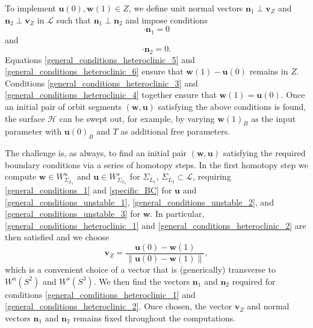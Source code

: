 \documentclass{ws-ijbc}
\begin{document}
To implement $\mathbf{u}(0), \mathbf{w}(1) \in Z$, we define unit normal vectors $\mathbf{n}_1 \perp \mathbf{v}_Z$ and $\mathbf{n}_2 \perp \mathbf{v}_Z$ in $\mathscr{L}$ such that $\mathbf{n}_1 \perp \mathbf{n}_2$ and impose conditions
%
\begin{equation}
	[\mathbf{u}(0) - \mathbf{w}(1)] \cdot \mathbf{n}_1 =0
	\label{general_conditions_heteroclinic_5}
\end{equation}
%
and
%
\begin{equation}	
	 [\mathbf{u}(0) - \mathbf{w}(1)] \cdot \mathbf{n}_2 =0.
	 \label{general_conditions_heteroclinic_6}
\end{equation}
%
Equations \eqref{general_conditions_heteroclinic_5} and \eqref{general_conditions_heteroclinic_6} ensure that $\mathbf{w}(1)-\mathbf{u}(0)$ remains in $Z$.  Conditions \eqref{general_conditions_heteroclinic_3} and \eqref{general_conditions_heteroclinic_4} together ensure that $\mathbf{w}(1) = \mathbf{u}(0)$.  Once an initial pair of orbit segments $(\mathbf{w}, \mathbf{u})$ satisfying the above conditions is found, the surface $\mathscr{H}$ can be swept out, for example, by varying $\mathbf{w}(1)_B$ as the input parameter with $\mathbf{u}(0)_B$ and $T$ as additional free parameters.  

The challenge is, as always, to find an initial pair $(\mathbf{w}, \mathbf{u})$ satisfying the required boundary conditions via a series of homotopy steps.  In the first homotopy step we compute $\mathbf{w} \in W^u_{\Sigma_{L_1}}$ and $\mathbf{u} \in W^s_{\Sigma_{L_2}}$ for $\Sigma_{L_1} $, $\Sigma_{L_2} \subset \mathscr{L}$, requiring \eqref{general_conditions_1} and \eqref{specific_BC} for $\mathbf{u}$ and \eqref{general_conditions_unstable_1}, \eqref{general_conditions_unstable_2}, and \eqref{general_conditions_unstable_3} for $\mathbf{w}$.  In particular, \eqref{general_conditions_heteroclinic_1} and \eqref{general_conditions_heteroclinic_2} are then satisfied and we choose
%
\begin{equation*}
		\mathbf{v}_Z = \frac{\mathbf{u}(0) - \mathbf{w}(1)}{\left\lVert \mathbf{u}(0) - \mathbf{w}(1) \right\lVert},
		\label{Lin_vector}
\end{equation*}
%
which is a convenient choice of a vector that is (generically) transverse to $W^u(S^2)$ and $W^s(S^3)$. We then find the vectors $\mathbf{n}_1$ and $\mathbf{n}_2$ required for conditions \eqref{general_conditions_heteroclinic_1} and  \eqref{general_conditions_heteroclinic_2}. Once chosen, the vector $\mathbf{v}_Z$ and normal vectors $\mathbf{n}_1$ and $\mathbf{n}_2$ remains fixed throughout the computations.
\end{document}

